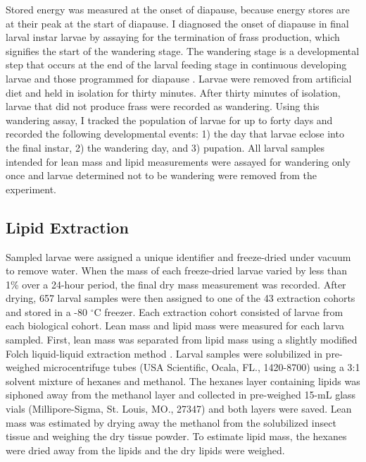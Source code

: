 \documentclass[review]{elsarticle}
\begin{document}
Stored energy was measured at the onset of diapause, because energy stores are at their peak at the start of diapause. I diagnosed the onset of diapause in final larval instar larvae by assaying for the termination of frass production, which signifies the start of the wandering stage. The wandering stage is a developmental step that occurs at the end of the larval feeding stage in continuous developing larvae and those programmed for diapause \citep{Sakurai1998}. Larvae were removed from artificial diet and held in isolation for thirty minutes. After thirty minutes of isolation, larvae that did not produce frass were recorded as wandering. Using this wandering assay, I tracked the population of larvae for up to forty days and recorded the following developmental events: 1) the day that larvae eclose into the final instar, 2) the wandering day, and 3) pupation. All larval samples intended for lean mass and lipid measurements were assayed for wandering only once and larvae determined not to be wandering were removed from the experiment. 

\subsection{Lipid Extraction}
Sampled larvae were assigned a unique identifier and freeze-dried under vacuum to remove water. When the mass of each freeze-dried larvae varied by less than 1\% over a 24-hour period, the final dry mass measurement was recorded. After drying, 657 larval samples were then assigned to one of the 43 extraction cohorts and stored in a -80 $^\circ$C freezer. Each extraction cohort consisted of larvae from each biological cohort. Lean mass and lipid mass were measured for each larva sampled. First, lean mass was separated from lipid mass using a slightly modified Folch liquid-liquid extraction method \citep{FOLCH1957}. Larval samples were solubilized in pre-weighed microcentrifuge tubes (USA Scientific, Ocala, FL., 1420-8700) using a 3:1 solvent mixture of hexanes and methanol. The hexanes layer containing lipids was siphoned away from the methanol layer and collected in pre-weighed 15-mL glass vials (Millipore-Sigma, St. Louis, MO., 27347) and both layers were saved. Lean mass was estimated by drying away the methanol from the solubilized insect tissue and weighing the dry tissue powder. To estimate lipid mass, the hexanes were dried away from the lipids and the dry lipids were weighed. 
\end{document}
